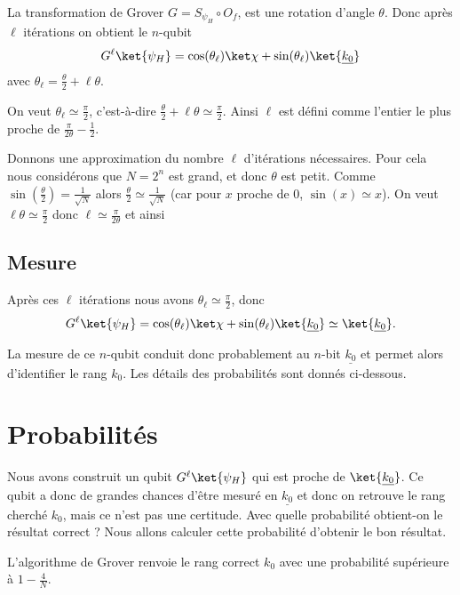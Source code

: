 \documentclass[11pt,class=report,crop=false]{standalone}
\begin{document}
La transformation de Grover $G = S_{\psi_H} \circ O_f$, est une rotation d'angle $\theta$. Donc après $\ell$ itérations on obtient le $n$-qubit
$$G^\ell\ket{\psi_H} = \cos(\theta_\ell) \ket\chi + \sin(\theta_\ell) \ket{\underline{k_0}}$$
avec $\theta_\ell = \frac\theta2+\ell\theta$.

On veut $\theta_\ell \simeq \frac\pi2$, c'est-à-dire $\frac\theta2+\ell\theta \simeq \frac\pi2$. Ainsi $\ell$ est défini comme l'entier le plus proche de $\frac{\pi}{2\theta}-\frac12$.


Donnons une approximation du nombre $\ell$ d'itérations nécessaires. Pour cela nous considérons que $N=2^n$ est grand, et donc $\theta$ est petit.
Comme $\sin\left(\frac\theta2\right)=\frac{1}{\sqrt{N}}$ alors
$\frac\theta2 \simeq \frac{1}{\sqrt{N}}$ (car pour $x$ proche de $0$, $\sin(x)\simeq x$). On veut $\ell\theta \simeq\frac\pi2$ donc
$\ell\simeq\frac\pi{2\theta}$ et ainsi


\subsection{Mesure}

Après ces $\ell$ itérations nous avons $\theta_\ell \simeq \frac\pi2$, donc
$$G^\ell\ket{\psi_H} = \cos(\theta_\ell) \ket\chi + \sin(\theta_\ell) \ket{\underline{k_0}} \simeq \ket{\underline{k_0}}.$$

La mesure de ce $n$-qubit conduit donc probablement au $n$-bit $\underline{k_0}$
et permet alors d'identifier le rang $k_0$. Les détails des probabilités sont donnés ci-dessous.


\section{Probabilités}


Nous avons construit un qubit $G^\ell\ket{\psi_H}$ qui est proche de $\ket{\underline{k_0}}$. Ce qubit a donc de grandes chances d'être mesuré 
en $\underline{k_0}$ et donc on retrouve le rang cherché $k_0$, mais ce n'est pas une certitude. Avec quelle probabilité obtient-on le résultat correct ?
Nous allons calculer cette probabilité d'obtenir le bon résultat.

\begin{proposition}
L'algorithme de Grover renvoie le rang correct $k_0$ avec une probabilité supérieure 
à $1-\frac4N$.
\end{proposition}
\end{document}
